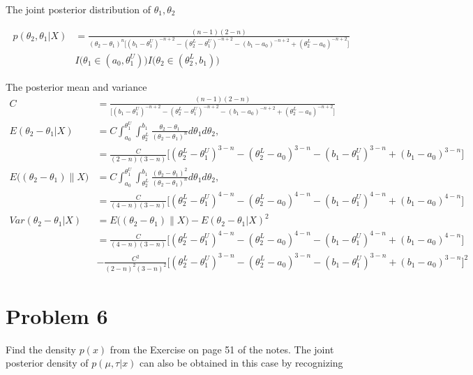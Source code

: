 \begin{itemize}
The joint posterior distribution of $\theta_1, \theta_2$

\begin{align*}
	p(\theta_2, \theta_1|X) &= \frac{  (n-1) (2-n)}{ (\theta_2-\theta_1)^n \Big[ (b_1 - \theta_1^{U})^{-n+2} - (\theta_{2}^{L} - \theta_1^{U})^{-n+2} - (b_1 - a_0)^{-n+2} + (\theta_{2}^{L} - a_0)^{-n+2} \Big]}\\
	& I \Big(\theta_1 \in (a_0, \theta_{1}^{U} ) \Big) I \Big(\theta_2 \in (\theta_{2}^{L}, b_1)\Big) 
\end{align*}	

The posterior mean and variance 
\begin{align*}
	C &=  \frac{  (n-1) (2-n)}{ \Big[ (b_1 - \theta_1^{U})^{-n+2} - (\theta_{2}^{L} - \theta_1^{U})^{-n+2} - (b_1 - a_0)^{-n+2} + (\theta_{2}^{L} - a_0)^{-n+2} \Big]}\\
	E(\theta_2- \theta_1|X) &=C \int_{a_0}^{\theta_{1}^{U}} \int_{\theta_{2}^{L}}^{b_1}\frac{ \theta_2-\theta_1}{ (\theta_2-\theta_1)^n } d\theta_1 d\theta_2 ,\\
	&= \frac{C}{(2-n)(3-n)} \Big[(\theta_2^L - \theta_1^U)^{3-n} - (\theta_2^L - a_0)^{3-n} - (b_1-\theta_1^U)^{3-n} + (b_1-a_0)^{3-n}\Big]\\
	E \Big((\theta_2- \theta_1)\|X \Big) &=C \int_{a_0}^{\theta_{1}^{U}} \int_{\theta_{2}^{L}}^{b_1}\frac{ (\theta_2-\theta_1)^2}{ (\theta_2-\theta_1)^n } d\theta_1 d\theta_2 ,\\
	&= \frac{C}{(4-n)(3-n)} \Big[(\theta_2^L - \theta_1^U)^{4-n} - (\theta_2^L - a_0)^{4-n} - (b_1-\theta_1^U)^{4-n} + (b_1-a_0)^{4-n}\Big]\\
	Var(\theta_2- \theta_1|X) & = E \Big((\theta_2- \theta_1)\|X \Big)- E(\theta_2- \theta_1|X)^2 \\
	&= \frac{C}{(4-n)(3-n)} \Big[(\theta_2^L - \theta_1^U)^{4-n} - (\theta_2^L - a_0)^{4-n} - (b_1-\theta_1^U)^{4-n} + (b_1-a_0)^{4-n}\Big] \\
	&- \frac{C^2}{(2-n)^2(3-n)^2} \Big[(\theta_2^L - \theta_1^U)^{3-n} - (\theta_2^L - a_0)^{3-n} - (b_1-\theta_1^U)^{3-n} + (b_1-a_0)^{3-n}\Big]^2
\end{align*}	

\end{itemize}



\section{Problem 6}
Find the density $p(x)$ from the Exercise on page 51 of the notes. The joint posterior density of $p(\mu, \tau|x)$ can also be obtained in this case by recognizing

